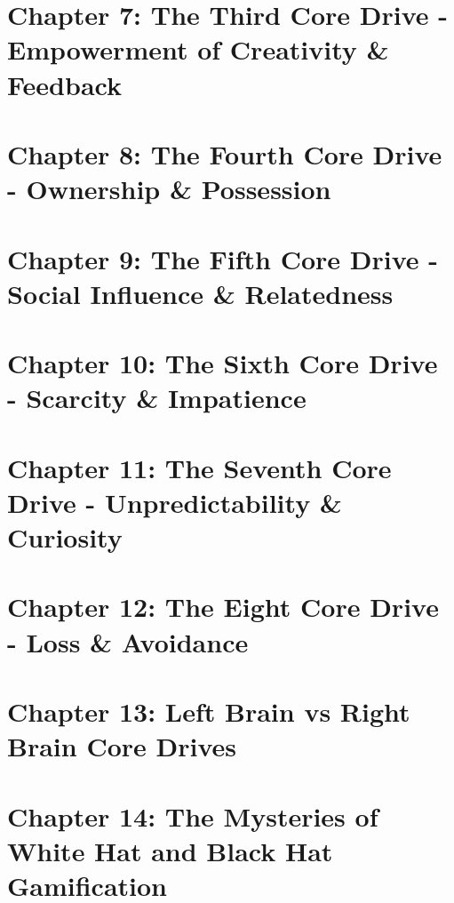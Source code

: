 \documentclass{article}
\theoremstyle{definition}
\theoremstyle{remark}
\begin{document}
\section{Chapter 7: The Third Core Drive - Empowerment of Creativity \& Feedback}


\newpage

\section{Chapter 8: The Fourth Core Drive - Ownership \& Possession}


\newpage

\section{Chapter 9: The Fifth Core Drive - Social Influence \& Relatedness}


\newpage

\section{Chapter 10: The Sixth Core Drive - Scarcity \& Impatience}


\newpage

\section{Chapter 11: The Seventh Core Drive - Unpredictability \& Curiosity}


\newpage

\section{Chapter 12: The Eight Core Drive - Loss \& Avoidance}


\newpage

\section{Chapter 13: Left Brain vs Right Brain Core Drives}


\newpage

\section{Chapter 14: The Mysteries of White Hat and Black Hat Gamification}

\end{document}
